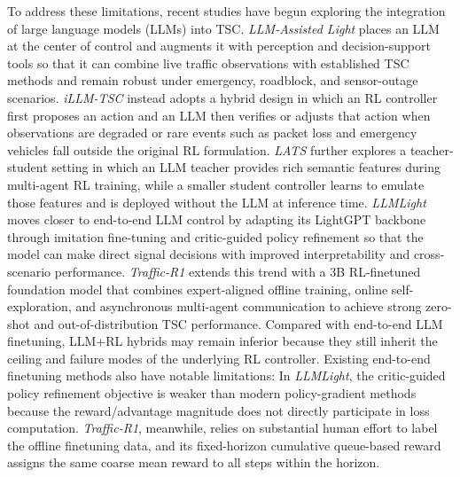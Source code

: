 To address these limitations, recent studies have begun exploring the integration of large language models (LLMs) into TSC. \textit{LLM-Assisted Light} \cite{wang2024llmassistedlightleveraging} places an LLM at the center of control and augments it with perception and decision-support tools so that it can combine live traffic observations with established TSC methods and remain robust under emergency, roadblock, and sensor-outage scenarios. \textit{iLLM-TSC} \cite{pang2024illmtscintegrationreinforcement} instead adopts a hybrid design in which an RL controller first proposes an action and an LLM then verifies or adjusts that action when observations are degraded or rare events such as packet loss and emergency vehicles fall outside the original RL formulation. \textit{LATS} \cite{zhang2026latslargelanguagemodelassisted} further explores a teacher-student setting in which an LLM teacher provides rich semantic features during multi-agent RL training, while a smaller student controller learns to emulate those features and is deployed without the LLM at inference time. \textit{LLMLight} \cite{lai2024llmlightlargelanguagemodels} moves closer to end-to-end LLM control by adapting its LightGPT backbone through imitation fine-tuning and critic-guided policy refinement so that the model can make direct signal decisions with improved interpretability and cross-scenario performance. \textit{Traffic-R1} \cite{zou2025trafficr1reinforcedllmsbring} extends this trend with a 3B RL-finetuned foundation model that combines expert-aligned offline training, online self-exploration, and asynchronous multi-agent communication to achieve strong zero-shot and out-of-distribution TSC performance. Compared with end-to-end LLM finetuning, LLM+RL hybrids may remain inferior because they still inherit the ceiling and failure modes of the underlying RL controller. Existing end-to-end finetuning methods also have notable limitations: In \textit{LLMLight}, the critic-guided policy refinement objective is weaker than modern policy-gradient methods because the reward/advantage magnitude does not directly participate in loss computation. \textit{Traffic-R1}, meanwhile, relies on substantial human effort to label the offline finetuning data, and its fixed-horizon cumulative queue-based reward assigns the same coarse mean reward to all steps within the horizon.

